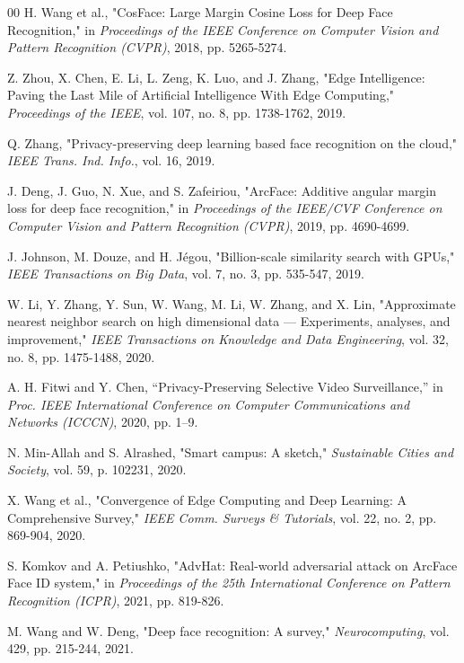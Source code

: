 \documentclass[conference]{IEEEtran}
\begin{document}
\begin{thebibliography}{00}
 H. Wang et al., "CosFace: Large Margin Cosine Loss for Deep Face Recognition," in \textit{Proceedings of the IEEE Conference on Computer Vision and Pattern Recognition (CVPR)}, 2018, pp. 5265-5274.

 Z. Zhou, X. Chen, E. Li, L. Zeng, K. Luo, and J. Zhang, "Edge Intelligence: Paving the Last Mile of Artificial Intelligence With Edge Computing," \textit{Proceedings of the IEEE}, vol. 107, no. 8, pp. 1738-1762, 2019.

 Q. Zhang, "Privacy-preserving deep learning based face recognition on the cloud," \textit{IEEE Trans. Ind. Info.}, vol. 16, 2019.

 J. Deng, J. Guo, N. Xue, and S. Zafeiriou, "ArcFace: Additive angular margin loss for deep face recognition," in \textit{Proceedings of the IEEE/CVF Conference on Computer Vision and Pattern Recognition (CVPR)}, 2019, pp. 4690-4699.

 J. Johnson, M. Douze, and H. Jégou, "Billion-scale similarity search with GPUs," \textit{IEEE Transactions on Big Data}, vol. 7, no. 3, pp. 535-547, 2019.

 W. Li, Y. Zhang, Y. Sun, W. Wang, M. Li, W. Zhang, and X. Lin, "Approximate nearest neighbor search on high dimensional data — Experiments, analyses, and improvement," \textit{IEEE Transactions on Knowledge and Data Engineering}, vol. 32, no. 8, pp. 1475-1488, 2020.

 A. H. Fitwi and Y. Chen, ``Privacy-Preserving Selective Video Surveillance,'' in \textit{Proc. IEEE International Conference on Computer Communications and Networks (ICCCN)}, 2020, pp. 1--9.

 N. Min-Allah and S. Alrashed, "Smart campus: A sketch," \textit{Sustainable Cities and Society}, vol. 59, p. 102231, 2020.

 X. Wang et al., "Convergence of Edge Computing and Deep Learning: A Comprehensive Survey," \textit{IEEE Comm. Surveys \& Tutorials}, vol. 22, no. 2, pp. 869-904, 2020.

 S. Komkov and A. Petiushko, "AdvHat: Real-world adversarial attack on ArcFace Face ID system," in \textit{Proceedings of the 25th International Conference on Pattern Recognition (ICPR)}, 2021, pp. 819-826.

 M. Wang and W. Deng, "Deep face recognition: A survey," \textit{Neurocomputing}, vol. 429, pp. 215-244, 2021.


\end{thebibliography}
\end{document}
